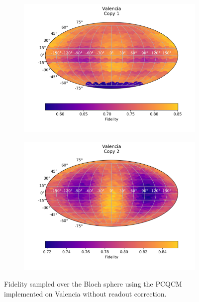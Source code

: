   \begin{figure}[H]
    \centering
    \begin{subfigure}{.5\textwidth}
      \centering
      \includegraphics[width=\textwidth]{Figures/PhaseCovariant/IBM/FullSphere/results_valencia_copy1.png}
      \label{fig:pc_uncorrected_valencia_sphere_1}
    \end{subfigure}%
    \begin{subfigure}{.5\textwidth}
      \centering
      \includegraphics[width=\textwidth]{Figures/PhaseCovariant/IBM/FullSphere/results_valencia_copy2.png}
      \label{fig:pc_uncorrected_valencia_sphere_2}
    \end{subfigure}
    \caption{Fidelity sampled over the Bloch sphere using the PCQCM implemented on Valencia without readout correction.}
    \label{fig:pc_uncorrected_valencia_sphere}
  \end{figure}
  

